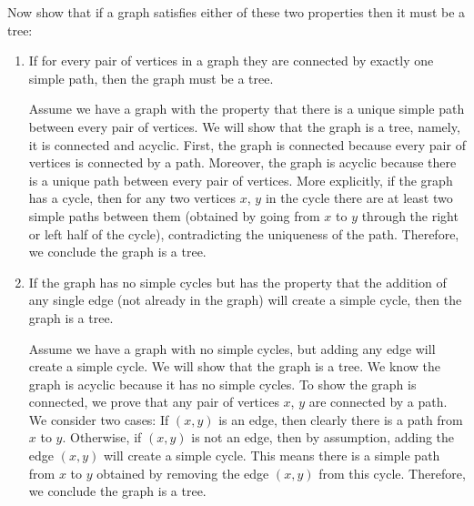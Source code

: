 \question Now show that if a graph satisfies either of these two 
properties then it must be a tree:
\begin{enumerate}[label=\alph*]
\item If for every pair of vertices in a graph they are connected by 
exactly one simple path, then the graph must be a tree.
\begin{solution}[1 in]
Assume we have a graph with the property that there is a unique simple 
path between every pair of vertices. We will show that the graph is a 
tree, namely, it is connected and acyclic. First, the graph is connected 
because every pair of vertices is connected by a path. Moreover, the 
graph is acyclic because there is a unique path between every pair of 
vertices. More explicitly, if the graph has a cycle, then for any two 
vertices $x$, $y$ in the cycle there are at least two simple paths 
between them (obtained by going from $x$ to $y$ through the right or 
left half of the cycle), contradicting the uniqueness of the path. 
Therefore, we conclude the graph is a tree.
\end{solution}

\item If the graph has no simple cycles but has the property that the 
addition of any single edge (not already in the graph) will create a 
simple cycle, then the graph is a tree.
\begin{solution}[1 in]
Assume we have a graph with no simple cycles, but adding any edge will 
create a simple cycle. We will show that the graph is a tree. We know 
the graph is acyclic because it has no simple cycles. To show the graph 
is connected, we prove that any pair of vertices $x$, $y$ are connected 
by a path. We consider two cases: If $(x, y)$ is an edge, then clearly 
there is a path from $x$ to $y$. Otherwise, if $(x,y)$ is not an edge, 
then by assumption, adding the edge $(x,y)$ will create a simple cycle. 
This means there is a simple path from $x$ to $y$ obtained by removing 
the edge $(x, y)$ from this cycle. Therefore, we conclude the graph is 
a tree.
\end{solution}
\end{enumerate}

